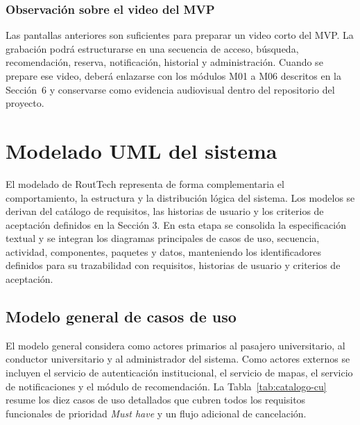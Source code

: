 \documentclass[12pt,a4paper]{article}
\begin{document}
\subsubsection{Observación sobre el video del MVP}

Las pantallas anteriores son suficientes para preparar un video corto del MVP. La grabación podrá estructurarse en una secuencia de acceso, búsqueda, recomendación, reserva, notificación, historial y administración. Cuando se prepare ese video, deberá enlazarse con los módulos M01 a M06 descritos en la Sección~6 y conservarse como evidencia audiovisual dentro del repositorio del proyecto.


\section{Modelado UML del sistema}

El modelado de RoutTech representa de forma complementaria el comportamiento, la estructura y la distribución lógica del sistema. Los modelos se derivan del catálogo de requisitos, las historias de usuario y los criterios de aceptación definidos en la Sección 3. En esta etapa se consolida la especificación textual y se integran los diagramas principales de casos de uso, secuencia, actividad, componentes, paquetes y datos, manteniendo los identificadores definidos para su trazabilidad con requisitos, historias de usuario y criterios de aceptación.

\subsection{Modelo general de casos de uso}

El modelo general considera como actores primarios al pasajero universitario, al conductor universitario y al administrador del sistema. Como actores externos se incluyen el servicio de autenticación institucional, el servicio de mapas, el servicio de notificaciones y el módulo de recomendación. La Tabla~\ref{tab:catalogo-cu} resume los diez casos de uso detallados que cubren todos los requisitos funcionales de prioridad \emph{Must have} y un flujo adicional de cancelación.
\end{document}
